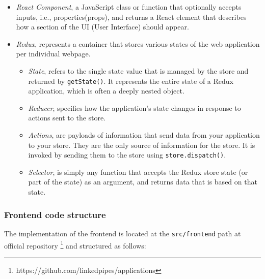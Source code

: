 \begin{itemize}
    \item \textit{React Component}, a JavaScript class or function that optionally accepts inputs, i.e., properties(props), and returns a React element that describes how a section of the UI (User Interface) should appear. 
    \item \textit{Redux}, represents a container that stores various states of the web application per individual webpage.
        \begin{itemize}
            \item \textit{State}, refers to the single state value that is managed by the store and returned by \texttt{getState()}. It represents the entire state of a Redux application, which is often a deeply nested object.
            \item \textit{Reducer}, specifies how the application's state changes in response to actions sent to the store.
            \item \textit{Actions}, are payloads of information that send data from your application to your store. They are the only source of information for the store. It is invoked by sending them to the store using \texttt{store.dispatch()}.
            \item \textit{Selector}, is simply any function that accepts the Redux store state (or part of the state) as an argument, and returns data that is based on that state.
        \end{itemize}
\end{itemize}

\subsubsection{Frontend code structure}
\label{ssssec:lpa_frontend_code_structure}

The implementation of the \lpa{} frontend is located at the \texttt{src/frontend} path at official \lpa{} repository \footnote{https://github.com/linkedpipes/applications}  and structured as follows:

